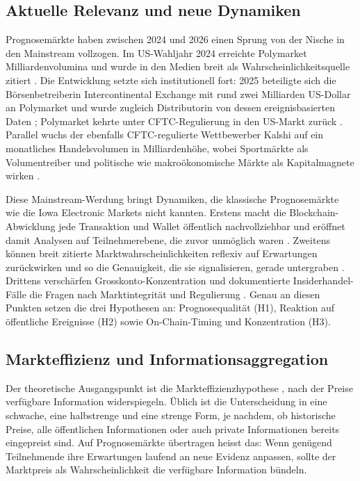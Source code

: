 \subsection{Aktuelle Relevanz und neue Dynamiken}
Prognosemärkte haben zwischen 2024 und 2026 einen Sprung von der Nische in den
Mainstream vollzogen. Im US-Wahljahr 2024 erreichte Polymarket Milliardenvolumina
und wurde in den Medien breit als Wahrscheinlichkeitsquelle zitiert
\citep{lit_poly24_accuracy,zotero_poly_001}. Die Entwicklung setzte sich
institutionell fort: 2025 beteiligte sich die Börsenbetreiberin Intercontinental
Exchange mit rund zwei Milliarden US-Dollar an Polymarket und wurde zugleich
Distributorin von dessen ereignisbasierten Daten \citep{news_ice_polymarket_2025};
Polymarket kehrte unter CFTC-Regulierung in den US-Markt zurück
\citep{ref_britannica_polymarket}. Parallel wuchs der ebenfalls CFTC-regulierte
Wettbewerber Kalshi auf ein monatliches Handelsvolumen in Milliardenhöhe, wobei
Sportmärkte als Volumentreiber und politische wie makroökonomische Märkte als
Kapitalmagnete wirken \citep{news_kpmg_prediction_2025}.

Diese Mainstream-Werdung bringt Dynamiken, die klassische Prognosemärkte wie die
Iowa Electronic Markets nicht kannten. Erstens macht die Blockchain-Abwicklung jede
Transaktion und Wallet öffentlich nachvollziehbar und eröffnet damit Analysen auf
Teilnehmerebene, die zuvor unmöglich waren \citep{news_chainalysis_forensics_001}.
Zweitens können breit zitierte Marktwahrscheinlichkeiten reflexiv auf Erwartungen
zurückwirken und so die Genauigkeit, die sie signalisieren, gerade untergraben
\citep{zotero_poly_009}. Drittens verschärfen Grosskonto-Konzentration und
dokumentierte Insiderhandel-Fälle die Fragen nach Marktintegrität und Regulierung
\citep{zotero_poly_001,news_polymarket_integrity_001}. Genau an diesen Punkten
setzen die drei Hypothesen an: Prognosequalität (H1), Reaktion auf öffentliche
Ereignisse (H2) sowie On-Chain-Timing und Konzentration (H3).

\subsection{Markteffizienz und Informationsaggregation}
Der theoretische Ausgangspunkt ist die Markteffizienzhypothese
\citep{lit_emh_001}, nach der Preise verfügbare Information widerspiegeln. Üblich
ist die Unterscheidung in eine schwache, eine halbstrenge und eine strenge Form,
je nachdem, ob historische Preise, alle öffentlichen Informationen oder auch
private Informationen bereits eingepreist sind. Auf Prognosemärkte übertragen
heisst das: Wenn genügend Teilnehmende ihre Erwartungen laufend an neue Evidenz
anpassen, sollte der Marktpreis als Wahrscheinlichkeit die verfügbare
Information bündeln.

